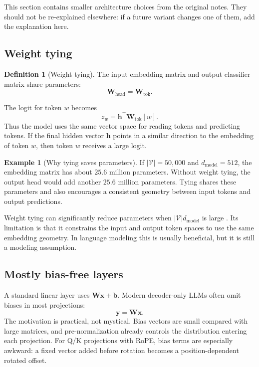 \documentclass[11pt,a4paper]{article}
\theoremstyle{definition}
\newtheorem{definition}{Definition}[section]
\newtheorem{example}{Example}[section]
\theoremstyle{plain}
\newcommand{\vx}{\bm{x}}
\newcommand{\vh}{\bm{h}}
\newcommand{\vy}{\bm{y}}
\newcommand{\mW}{\bm{W}}
\newcommand{\dmodel}{d_{\mathrm{model}}}
\newcommand{\vocab}{|\mathcal{V}|}
\begin{document}
This section contains smaller architecture choices from the original notes. They should not be re-explained elsewhere: if a future variant changes one of them, add the explanation here.

\subsection{Weight tying}

\begin{definition}[Weight tying]
The input embedding matrix and output classifier matrix share parameters:
\begin{equation}
    \mW_{\mathrm{head}}=\mW_{\mathrm{tok}}.
\end{equation}
\end{definition}
The logit for token $w$ becomes
\begin{equation}
    z_w=\vh^\top\mW_{\mathrm{tok}}[w].
\end{equation}
Thus the model uses the same vector space for reading tokens and predicting tokens. If the final hidden vector $\vh$ points in a similar direction to the embedding of token $w$, then token $w$ receives a large logit.

\begin{example}[Why tying saves parameters]
If $\vocab=50{,}000$ and $\dmodel=512$, the embedding matrix has about $25.6$ million parameters. Without weight tying, the output head would add another $25.6$ million parameters. Tying shares these parameters and also encourages a consistent geometry between input tokens and output predictions.
\end{example}

Weight tying can significantly reduce parameters when $\vocab\dmodel$ is large \cite{press2017weighttying}. Its limitation is that it constrains the input and output token spaces to use the same embedding geometry. In language modeling this is usually beneficial, but it is still a modeling assumption.

\subsection{Mostly bias-free layers}

A standard linear layer uses $\mW\vx+\bm b$. Modern decoder-only LLMs often omit biases in most projections:
\begin{equation}
    \vy=\mW\vx.
\end{equation}
The motivation is practical, not mystical. Bias vectors are small compared with large matrices, and pre-normalization already controls the distribution entering each projection. For Q/K projections with RoPE, bias terms are especially awkward: a fixed vector added before rotation becomes a position-dependent rotated offset.
\end{document}
